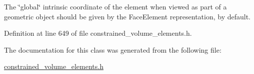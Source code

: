 The \char`\"{}global\char`\"{} intrinsic coordinate of the element when viewed as part of a geometric object should be given by the Face\+Element representation, by default. 



Definition at line 649 of file constrained\+\_\+volume\+\_\+elements.\+h.



The documentation for this class was generated from the following file\+:\begin{DoxyCompactItemize}
\item 
\hyperlink{constrained__volume__elements_8h}{constrained\+\_\+volume\+\_\+elements.\+h}\end{DoxyCompactItemize}

